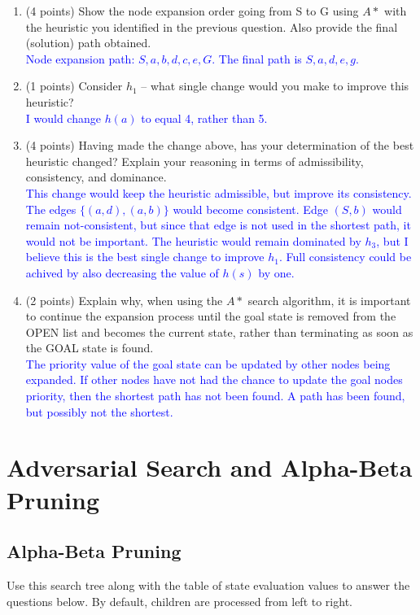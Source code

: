 \documentclass[12pt]{article}
\newenvironment{qparts}{\begin{enumerate}[{(}a{)}]}{\end{enumerate}}
\begin{document}
\begin{qparts}
  \item  (4 points)
  Show the node expansion order going from S to G using $A*$
  with the heuristic you identified in the previous question.
  Also provide the final (solution) path obtained. \\
  \textcolor{blue}{Node expansion path: $S, a, b, d, c, e, G$. The final path is $S, a, d, e, g$.}

  \item (1 points) Consider $h_1$ -- what single change would
  you make to improve this heuristic? \\
  \textcolor{blue}{I would change $h(a)$ to equal 4, rather than 5.}
  \item (4 points) Having made the change above,
  has your determination of the best heuristic changed?
  Explain your reasoning in terms of admissibility, consistency,
  and dominance.\\
  \textcolor{blue}{This change would keep the heuristic admissible, but improve its consistency. The edges $\{(a, d), (a, b)\}$ would become consistent. Edge $(S, b)$ would remain not-consistent, but since that edge is not used in the shortest path, it would not be important. The heuristic would remain dominated by $h_3$, but I believe this is the best single change to improve $h_1$. Full consistency could be achived by also decreasing the value of $h(s)$ by one.}


  \item (2 points)  Explain why, when using the $A*$ search algorithm,
  it is important to continue the expansion process until
  the goal state is removed from the OPEN list and becomes
  the current state, rather than terminating as soon as the GOAL state is found.\\
  \textcolor{blue}{The priority value of the goal state can be updated by other nodes being expanded. If other nodes have not had the chance to update the goal nodes priority, then the shortest path has not been found. A path has been found, but possibly not the shortest.}
\end{qparts}


\newpage
\section{Adversarial Search and Alpha-Beta Pruning}

\subsection{Alpha-Beta Pruning}
Use this search tree along with the table of state
evaluation values to answer the questions below.
By default, children are processed from left to right.
\end{document}
